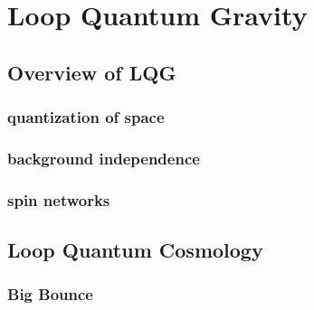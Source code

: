 \section{Loop Quantum Gravity}

\subsection{Overview of LQG}
\subsubsection{quantization of space}
\subsubsection{background independence}
\subsubsection{spin networks}

\subsection{Loop Quantum Cosmology}
\subsubsection{Big Bounce}
